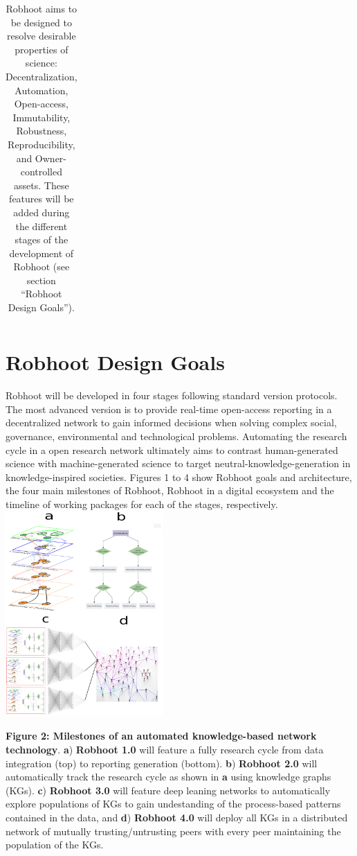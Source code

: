 \documentclass[10pt, a4paper, twocolumn]{article} %
\begin{document}
{\begin{table}
\begin{tabular}{ p{3cm} | p{2cm} | p{2cm}}
\end{tabular}
\caption{Robhoot aims to be designed to resolve desirable properties
  of science: Decentralization, Automation, Open-access, Immutability,
  Robustness, Reproducibility, and Owner-controlled assets. These
  features will be added during the different stages of the
  development of Robhoot (see section ``Robhoot Design Goals'').}
\end{table}
  \section{Robhoot Design Goals}
  Robhoot will be developed in four stages following standard version
  protocols. The most advanced version is to provide real-time
  open-access reporting in a decentralized network to gain informed
  decisions when solving complex social, governance, environmental and
  technological problems. Automating the research cycle in a open
  research network ultimately aims to contrast human-generated science
  with machine-generated science to target
  neutral-knowledge-generation in knowledge-inspired
  societies. Figures 1 to 4 show Robhoot goals and architecture, the
  four main milestones of Robhoot, Robhoot in a digital ecosystem and
  the timeline of working packages for each of the stages,
  respectively.  \includegraphics[width=0.45\textwidth]{Figure1.pdf}

  {\small {\bf Figure 2: Milestones of an automated knowledge-based
      network technology}. {\bf a}) {\bf Robhoot 1.0} will feature a
    fully research cycle from data integration (top) to reporting
    generation (bottom). {\bf b}) {\bf Robhoot 2.0} will automatically
    track the research cycle as shown in {\bf a} using knowledge
    graphs (KGs). {\bf c}) {\bf Robhoot 3.0} will feature deep leaning
    networks to automatically explore populations of KGs to gain
    undestanding of the process-based patterns contained in the
    data, and {\bf d}) {\bf Robhoot 4.0} will deploy all KGs in a
    distributed network of mutually trusting/untrusting peers with
    every peer maintaining the population of the KGs.}
  
}
\end{document}
